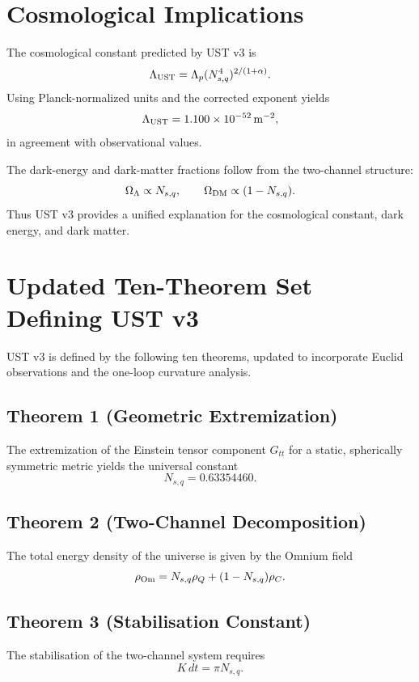 \documentclass[12pt]{article}
\begin{document}
\section{Cosmological Implications}

The cosmological constant predicted by UST v3 is
\[
\Lambda_{\rm UST} = \Lambda_p (N_{s,q}^4)^{2/(1+\alpha)}.
\]
Using Planck-normalized units and the corrected exponent yields
\[
\Lambda_{\rm UST} = 1.100\times 10^{-52}\,{\rm m}^{-2},
\]
in agreement with observational values.

The dark-energy and dark-matter fractions follow from the two-channel
structure:
\[
\Omega_{\Lambda} \propto N_{s,q}, \qquad
\Omega_{\rm DM} \propto (1-N_{s,q}).
\]
Thus UST v3 provides a unified explanation for the cosmological constant,
dark energy, and dark matter.



\section{Updated Ten-Theorem Set Defining UST v3}

UST v3 is defined by the following ten theorems, updated to incorporate
Euclid observations and the one-loop curvature analysis.

\subsection*{Theorem 1 (Geometric Extremization)}
The extremization of the Einstein tensor component $G_{tt}$ for a static,
spherically symmetric metric yields the universal constant
\[
N_{s,q} = 0.63354460.
\]

\subsection*{Theorem 2 (Two-Channel Decomposition)}
The total energy density of the universe is given by the Omnium field
\[
\rho_{\rm Om} = N_{s,q}\rho_Q + (1-N_{s,q})\rho_C.
\]

\subsection*{Theorem 3 (Stabilisation Constant)}
The stabilisation of the two-channel system requires
\[
K\,dt = \pi N_{s,q}.
\]
\end{document}

